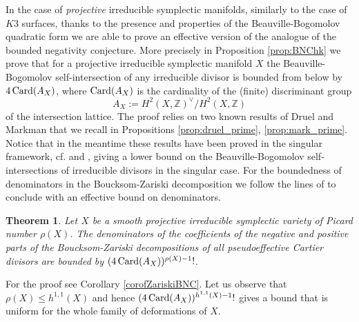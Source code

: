 \documentclass[12pt,reqno]{amsart}
\def\Card{\mathop{\rm Card}\nolimits}
\newtheorem{thm}{Theorem}[section]
\theoremstyle{plain}
\theoremstyle{definition}
\begin{document}
In the case of {\it projective} irreducible symplectic manifolds, similarly to the case of $K3$ surfaces, thanks to the presence and properties of the Beauville-Bogomolov quadratic form we are able to prove an effective version of the analogue of the bounded negativity conjecture. More precisely in Proposition \ref{prop:BNChk} we prove that for a   projective     irreducible symplectic manifold $X$ the Beauville-Bogomolov self-intersection of any irreducible divisor is bounded from below by $4 \Card(A_X) $, where $\Card(A_X)$ is the  cardinality of the (finite) discriminant group 
$$A_X:=H^2(X,\mathbb Z)^\vee/H^2(X,\mathbb Z)$$
of the intersection lattice.
 The proof relies on two known results of Druel and Markman that we recall in Propositions \ref{prop:druel_prime}, \ref{prop:mark_prime}. 
 Notice that in the meantime these results have been proved in the singular framework, cf. \cite[Theorem 1.2, item (1)]{LMP} and \cite[Remark 3.11]{LMP2},  giving a lower bound on the Beauville-Bogomolov self-intersections of irreducible divisors in the singular case.
 For the boundedness of denominators in the Boucksom-Zariski decomposition we follow the lines of \cite{BPS17} to conclude with an effective bound  on denominators.
\begin{thm}\label{thm:bound-intro}
Let $X$ be a smooth projective irreducible symplectic variety of Picard number $\rho(X)$. The denominators of the coefficients of the negative and positive parts of the Boucksom-Zariski
decompositions of all pseudoeffective Cartier divisors   are  bounded by $(4\Card(A_X))^{\rho(X)-1} !$. 
\end{thm}
For the proof see Corollary \ref{corofZariskiBNC}.  Let us observe that $\rho(X)\leq h^{1,1}(X)$ and hence $(4\Card(A_X))^{h^{1,1}(X)-1} !$ gives a bound that is uniform for the whole family of deformations of $X$.
\end{document}
